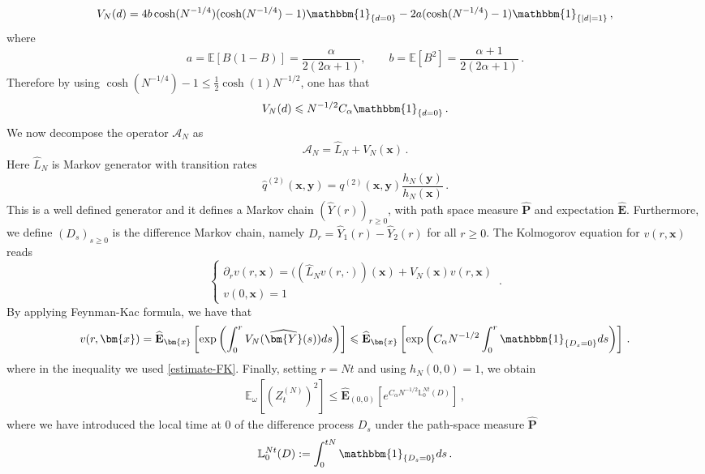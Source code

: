 \documentclass[a4paper,11pt,oneside,reqno]{amsart}
\theoremstyle{definition}
\renewcommand{\leq}{\leqslant}
\renewcommand{\geq}{\geqslant}
\numberwithin{equation}{section}
\begin{document}
{\begin{equation*}
	V_{N}(d)=4b \cosh(N^{-1/4})(\cosh(N^{-1/4})-1)\mathbbm{1}_{\{d=0\}}	-2a (\cosh(N^{-1/4})-1)\mathbbm{1}_{\{|d|=1\}}\,,
\end{equation*}
where 
\begin{equation*}
	a= \mathbb{E}[B(1-B)]=\frac{\alpha}{2(2\alpha+1)},\qquad b= \mathbb{E}[B^{2}]=\frac{\alpha+1}{2(2\alpha+1)}\,.
\end{equation*}
Therefore by using $\cosh(N^{-1/4})-1\leq \frac{1}{2}\cosh(1)N^{-1/2}$, one has that
\begin{equation}\label{estimate-FK}
	V_{N}(d)\leq N^{-1/2} C_{\alpha}\mathbbm{1}_{\{d=0\}}\,.
\end{equation}
We now decompose the operator  $\mathcal{A}_{N}$ as 
\begin{equation*}
	\mathcal{A}_{N}=	\widehat{L}_{N}+V_{N}(\bm{x})\,.
\end{equation*}
Here $\widehat{L}_{N}$ is Markov generator with transition rates 
\begin{equation*}
	\widehat{q}^{(2)}(\bm{x},\bm{y})= q^{(2)}(\bm{x},\bm{y})\frac{h_{N}(\bm{y})}{h_{N}(\bm{x})}\,.
\end{equation*}
This is a well defined generator and it defines a Markov chain  $(\widehat{Y}(r))_{r\geq 0}$, with path space measure $\widehat{\mathbf{P}}$ and expectation $\widehat{\mathbf{E}}$. Furthermore, we define $(D_{s})_{s\geq 0}$ is the difference Markov chain, namely $D_{r}=\widehat{Y}_{1}(r)-\widehat{Y}_{2}(r)$ for all $r\geq 0$. 
The Kolmogorov equation for $v(r,\bm{x})$ reads 
\begin{equation*}
	\begin{cases}
		\partial_{r}v(r,\bm{x})= ((\widehat{L}_{N}v(r,\cdot))(\bm{x})+V_{N}(\bm{x})v(r,\bm{x})\\
		v(0,\bm{x})=1
	\end{cases}\,.
\end{equation*}
By applying Feynman-Kac formula, we have that 
\begin{equation}
	v(r,\bm{x})= \widehat{\mathbf{E}}_{\bm{x}}\left[\exp{\left(\int_{0}^{r}V_{N}(\widehat{\bm{Y}}(s))ds\right)}\right]\leq \widehat{\mathbf{E}}_{\bm{x}}\left[\exp{\left(C_{\alpha}N^{-1/2}\int_{0}^{r}\mathbbm{1}_{\{D_{s}=0\}}ds\right)}\right]\,.
	\label{eq:ulessthanLaplacelocaltime}
\end{equation}
where in the inequality we used \eqref{estimate-FK}. 
Finally, setting $r=Nt$ and using $h_N(0,0)=1$, we obtain
\begin{equation*}
	\begin{split}
		\mathbb E_\omega[(Z_t^{(N)})^2]
		\leq
		\widehat{\mathbf E}_{(0,0)}
		\left[
		e^{C_\alpha N^{-1/2}\mathbb{L}_{0}^{Nt}(D)}
		\right]\,,
	\end{split}
\end{equation*}
where we have introduced the local time at $0$ of the difference process $D_{s}$ under the path-space measure $\widehat{\mathbf{P}}$
\begin{equation*}
	\mathbb{L}_{0}^{Nt}(D):=\int_{0}^{tN}\mathbbm{1}_{\{D_{s}=0\}}ds\,.
\end{equation*}


}
\end{document}
